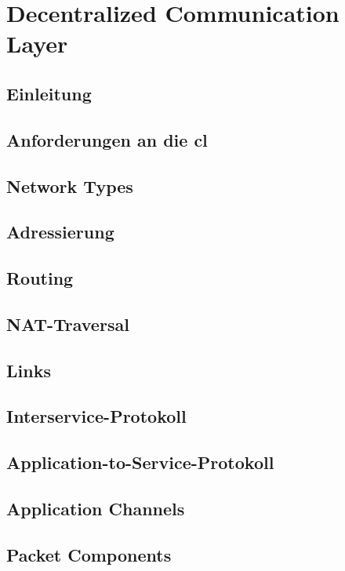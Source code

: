 \chapter{Decentralized Communication Layer}
\renewcommand{\kapitelautor}{Autor: Martin Exner}

\section{Einleitung}


\section{Anforderungen an die \gls*{cl}}


\section{Network Types}


\section{Adressierung}


\section{Routing}


\section{NAT-Traversal}


\section{Links}


\section{Interservice-Protokoll}


\section{Application-to-Service-Protokoll}


\section{Application Channels}


\section{Packet Components}

